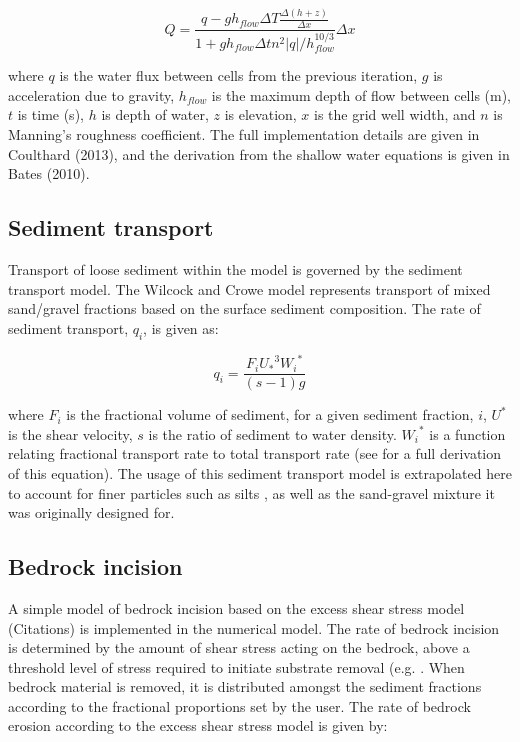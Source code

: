\documentclass[12pt,oneside,PhD]{muthesis}
\begin{document}
\begin{equation}
Q = \frac{q - g h_{flow} \Delta T \frac{\Delta (h+z) }{\Delta x}}{1 + g h_{flow} \Delta t n^2 |q| / h_{flow}^{10/3}} \Delta x
\end{equation}

where \(q\) is the water flux between cells from the previous iteration, \(g\) is acceleration due to gravity, \(h_{flow}\) is the maximum depth of flow between cells (m), \(t\) is time (s), \(h\) is depth of water, \(z\) is elevation, \(x\) is the grid well width, and \(n\) is Manning's roughness coefficient. The full implementation details are given in Coulthard (2013), and the derivation from the shallow water equations is given in Bates (2010).

\subsection{Sediment transport}
Transport of loose sediment within the model is governed by the \citet{Wilcock2003} sediment transport model. The Wilcock and Crowe model represents transport of mixed sand/gravel fractions based on the surface sediment composition. The rate of sediment transport, \(q_i\), is given as:

\begin{equation}
q_i = \frac{F_i {U_*}^3 {W_i}^*}{(s -1) g}
\end{equation}

where \(F_i\) is the fractional volume of sediment, for a given sediment fraction, \(i\), \(U^*\) is the shear velocity, \(s\) is the ratio of sediment to water density. \({W_i}^*\) is a function relating fractional transport rate to total transport rate (see \citet{Wilcock2003} for a full derivation of this equation). The usage of this sediment transport model is extrapolated here to account for finer particles such as silts \citep{Vandewiel2007}, as well as the sand-gravel mixture it was originally designed for.

\subsection{Bedrock incision}
\label{bedrock_model}
A simple model of bedrock incision based on the excess shear stress model (Citations) is implemented in the numerical model. The rate of bedrock incision is determined by the amount of shear stress acting on the bedrock, above a threshold level of stress required to initiate substrate removal (e.g. \citet{Snyder2003}. When bedrock material is removed, it is distributed amongst the sediment fractions according to the fractional proportions set by the user. The rate of bedrock erosion according to the excess shear stress model is given by:
\end{document}
